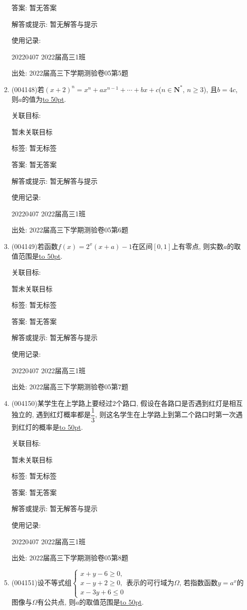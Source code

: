 \documentclass[10pt,a4paper]{article}
\newcommand{\blank}[1]{\underline{\hbox to #1pt{}}}
\begin{document}
\begin{enumerate}[1.]
答案: 暂无答案

解答或提示: 暂无解答与提示

使用记录:

20220407	2022届高三1班	


出处: 2022届高三下学期测验卷05第5题
\item { (004148)}若$(x+2)^n=x^n+ax^{n-1}+\cdots +bx+c$($n\in \mathbf{N}^*$, $ n\ge 3$), 且$b=4c$, 则$a$的值为\blank{50}.


关联目标:

暂未关联目标



标签: 暂无标签

答案: 暂无答案

解答或提示: 暂无解答与提示

使用记录:

20220407	2022届高三1班	


出处: 2022届高三下学期测验卷05第6题
\item { (004149)}若函数$f(x)=2^x(x+a)-1$在区间$[0,1]$上有零点, 则实数$a$的取值范围是\blank{50}.


关联目标:

暂未关联目标



标签: 暂无标签

答案: 暂无答案

解答或提示: 暂无解答与提示

使用记录:

20220407	2022届高三1班	


出处: 2022届高三下学期测验卷05第7题
\item { (004150)}某学生在上学路上要经过$2$个路口, 假设在各路口是否遇到红灯是相互独立的, 遇到红灯概率都是$\dfrac 13$, 则这名学生在上学路上到第二个路口时第一次遇到红灯的概率是\blank{50}.


关联目标:

暂未关联目标



标签: 暂无标签

答案: 暂无答案

解答或提示: 暂无解答与提示

使用记录:

20220407	2022届高三1班	


出处: 2022届高三下学期测验卷05第8题
\item { (004151)}设不等式组$\begin{cases} x+y-6\ge 0, \\ x-y+2\ge 0, \\ x-3y+6\le 0 \end{cases}$表示的可行域为$\Omega$, 若指数函数$y=a^x$的图像与$\Omega$有公共点, 则$a$的取值范围是\blank{50}.



\end{enumerate}
\end{document}
